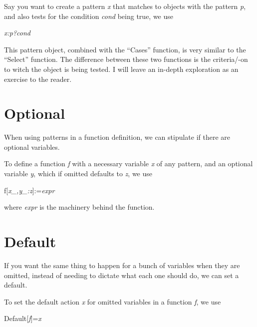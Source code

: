\documentclass[11pt,letterpaper,twoside,titlepage]{book}
\begin{document}
				Say you want to create a pattern \emph{x} that matches to objects with the pattern \emph{p}, and also tests for the condition \emph{cond} being true, we use
				
				\begin{center}
				
					\emph{x:p?cond}
				
				\end{center}
				
				This pattern object, combined with the ``Cases'' function, is very similar to the ``Select'' function.  The difference between these two functions is the criteria/-on to witch the object is being tested.  I will leave an in-depth exploration as an exercise to the reader.
				
			\section{Optional}
			
				When using patterns in a function definition, we can stipulate if there are optional variables.  
				
				To define a function \emph{f} with a necessary variable \emph{x} of any pattern, and an optional variable \emph{y}, which if omitted defaults to \emph{z}, we use
				
				\begin{center}
				
					f[\emph{x\_,y\_:z}]:=\emph{expr}
				
				\end{center}
				
				where \emph{expr} is the machinery behind the function.
				
			\section{Default}
			
				If you want the same thing to happen for a bunch of variables when they are omitted, instead of needing to dictate what each one should do, we can set a default.  
				
				To set the default action \emph{x} for omitted variables in a function \emph{f}, we use
				
				\begin{center}
				
					Default[\emph{f}]=\emph{x}
				
				\end{center}
				
\end{document}
